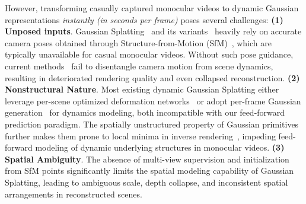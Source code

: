 However, transforming casually captured monocular videos to dynamic Gaussian representations \textit{instantly (in seconds per frame)} poses several challenges: 
\textbf{ (1) Unposed inputs}. Gaussian Splatting~\cite{kerbl20233d} and its variants~\cite{yu2024mip, yu2024gaussian, huang20242d} heavily rely on accurate camera poses obtained through Structure-from-Motion (SfM)~\cite{ullman1979interpretation, schonberger2016structure}, which are typically unavailable for casual monocular videos. Without such pose guidance, current methods~\cite{Fu_2024_CVPR, bian2023nope, lin2021barf, wang2021nerf} fail to disentangle camera motion from scene dynamics, resulting in deteriorated rendering quality and even collapsed reconstruction. 
\textbf{(2) Nonstructural Nature}. Most existing dynamic Gaussian Splatting either leverage per-scene optimized deformation networks~\cite{yang2024deformable, wu20244d, duan20244d, katsumata2025compact, kratimenos2025dynmf, yang2023real} or adopt per-frame Gaussian generation~\cite{ren2024l4gm} for dynamics modeling, both incompatible with our feed-forward prediction paradigm. 
The spatially unstructured property of Gaussian primitives further makes them prone to local minima in inverse rendering~\cite{zhu2025fsgs, chung2024depth}, impeding feed-forward modeling of dynamic underlying structures in monocular videos.
\textbf{(3) Spatial Ambiguity}. The absence of multi-view supervision and initialization from SfM points significantly limits the spatial modeling capability of Gaussian Splatting, leading to ambiguous scale, depth collapse, and inconsistent spatial arrangements in reconstructed scenes.





